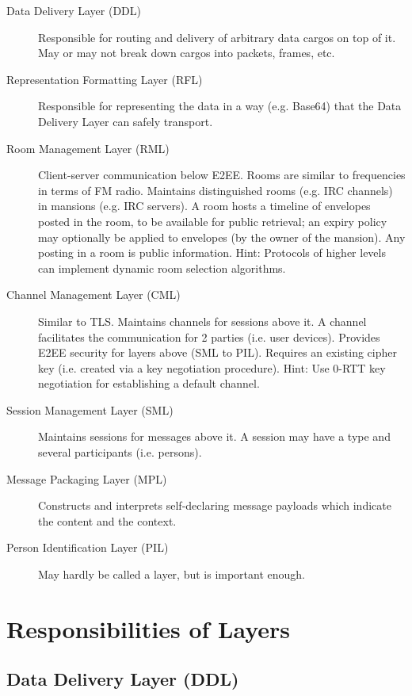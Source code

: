 \documentclass[a4paper,11pt]{article}
\begin{document}
\begin{description}
	\item[Data Delivery Layer (DDL)]
		Responsible for routing and delivery of arbitrary data cargos on top of it.
		May or may not break down cargos into packets, frames, etc.
	\item[Representation Formatting Layer (RFL)]
		Responsible for representing the data in a way (e.g. Base64) that the Data Delivery Layer can safely transport.
	\item[Room Management Layer (RML)]
		Client-server communication below E2EE.
		Rooms are similar to frequencies in terms of FM radio.
		Maintains distinguished rooms (e.g. IRC channels) in mansions (e.g. IRC servers).
		A room hosts a timeline of envelopes posted in the room, to be available for public retrieval;
		an expiry policy may optionally be applied to envelopes (by the owner of the mansion).
		Any posting in a room is public information.
		Hint: Protocols of higher levels can implement dynamic room selection algorithms.
	\item[Channel Management Layer (CML)]
		Similar to TLS.
		Maintains channels for sessions above it.
		A channel facilitates the communication for 2 parties (i.e. user devices).
		Provides E2EE security for layers above (SML to PIL).
		Requires an existing cipher key (i.e. created via a key negotiation procedure).
		Hint: Use 0-RTT key negotiation for establishing a default channel.
	\item[Session Management Layer (SML)]
		Maintains sessions for messages above it.
		A session may have a type and several participants (i.e. persons).
	\item[Message Packaging Layer (MPL)]
		Constructs and interprets self-declaring message payloads which indicate the content and the context.
	\item[Person Identification Layer (PIL)]
		May hardly be called a layer, but is important enough.
\end{description}





\section{Responsibilities of Layers}

\subsection{Data Delivery Layer (DDL)}
\end{document}
